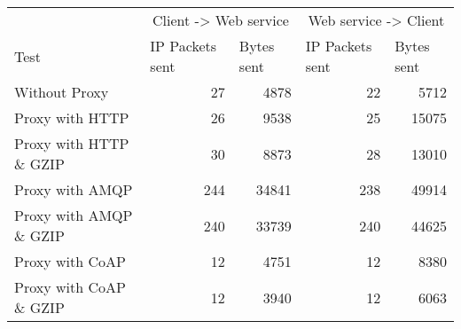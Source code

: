 \begin{tabular}{lrrrr}
\hline
\multicolumn{1}{l}{}                  & \multicolumn{2}{c}{Client -> Web service}                           & \multicolumn{2}{c}{Web service -> Client}                           \\
\multicolumn{1}{l}{Test} & \multicolumn{1}{l}{IP Packets sent} & \multicolumn{1}{l}{Bytes sent} & \multicolumn{1}{l}{IP Packets sent} & \multicolumn{1}{l}{Bytes sent} \\ \hline
Without Proxy                   & 27             & 4878           & 22             & 5712           \\
Proxy with HTTP                 & 26             & 9538           & 25             & 15075          \\
Proxy with HTTP \& GZIP         & 30             & 8873           & 28             & 13010          \\
Proxy with AMQP                 & 244            & 34841          & 238            & 49914          \\
Proxy with AMQP \& GZIP         & 240            & 33739          & 240            & 44625          \\
Proxy with CoAP                 & 12             & 4751           & 12             & 8380           \\
Proxy with CoAP \& GZIP         & 12             & 3940           & 12             & 6063           \\
\end{tabular}